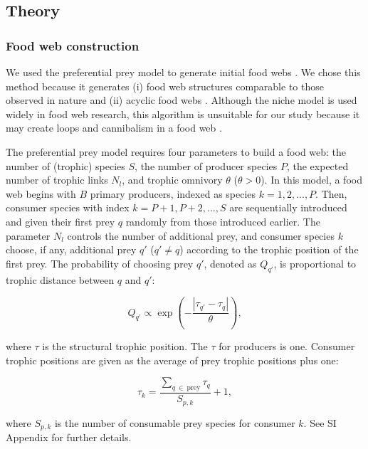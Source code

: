 \documentclass[11pt, class=article, crop=false]{standalone}
\begin{document}
\subsection{Theory}

\subsubsection{Food web construction}

We used the preferential prey model to generate initial food webs \citep{johnson_trophic_2014}.
We chose this method because it generates (i) food web structures comparable to those observed in nature and (ii) acyclic food webs \citep{shibasaki_food_2024}.
Although the niche model \citep{williams_simple_2000} is used widely in food web research, this algorithm is unsuitable for our study because it may create loops and cannibalism in a food web \citep{shibasaki_food_2024}.

The preferential prey model requires four parameters to build a food web: the number of (trophic) species $S$, the number of producer species $P$, the expected number of trophic links $N_l$, and trophic omnivory $\theta$ ($\theta > 0$).
In this model, a food web begins with $B$ primary producers, indexed as species $k = 1, 2, ..., P$.
Then, consumer species with index $k = P + 1, P + 2, ..., S$ are sequentially introduced and given their first prey $q$ randomly from those introduced earlier.
The parameter $N_l$ controls the number of additional prey, and consumer species $k$ choose, if any, additional prey $q'$ ($q' \ne q$) according to the trophic position of the first prey.
The probability of choosing prey $q'$, denoted as $Q_{q'}$, is proportional to trophic distance between $q$ and $q'$:

\begin{equation}
    Q_{q'} \propto \exp(-\frac{|\tau_{q'} - \tau_q|}{\theta}),
\end{equation}

where $\tau$ is the structural trophic position.
The $\tau$ for producers is one.
Consumer trophic positions are given as the average of prey trophic positions plus one:

\begin{equation}
    \tau_k = \frac{\sum_{q~\in~\text{prey}} \tau_q}{S_{p, k}} + 1,
\end{equation}

where $S_{p,k}$ is the number of consumable prey species for consumer $k$.
See SI Appendix for further details.
\end{document}
